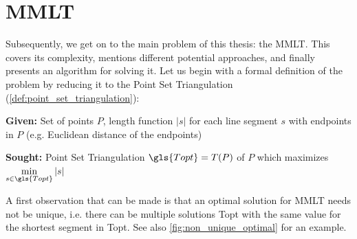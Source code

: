 \chapter{\texorpdfstring{\glsdesc{MMLT}}{MMLT}}
\label{cha:mmlt}
Subsequently, we get on to the main problem of this thesis: the
\gls{MMLT}. This  covers its complexity, mentions
different potential approaches, and finally presents an algorithm
for solving it. Let us begin with a formal definition of the problem
by reducing it to the Point Set Triangulation
(\cref{def:point_set_triangulation}):

\begin{problem}
  \label{prob:mmlt}\hfill
  \begin{labeling}{\hspace{4em}}
    \item[\textbf{Given:}]
      Set of points \(P\), length function \(|s|\)
      for each line segment \(s\) with endpoints in \(P\)
      (e.g. Euclidean distance of the endpoints)
    \item[\textbf{Sought:}]
      Point Set Triangulation \(\gls{Topt} = T(P)\) of \(P\)
      which maximizes \(\min\limits_{s\in \gls{Topt}} |s|\)
  \end{labeling}
\end{problem}

A first observation that can be made is that an optimal solution for
\gls{MMLT} needs not be unique, i.e. there can be multiple solutions
\gls{Topt} with the same value for the shortest segment in \gls{Topt}.
See also \cref{fig:non_unique_optimal} for an example.

